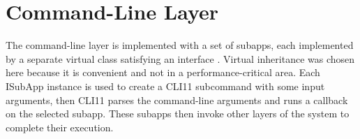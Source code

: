 \section{Command-Line Layer}
The command-line layer is implemented with a set of subapps, each implemented by a separate virtual class satisfying an interface .
Virtual inheritance was chosen here because it is convenient and not in a performance-critical area.
Each ISubApp instance is used to create a CLI11 subcommand with some input arguments, then CLI11 parses the command-line arguments and runs a callback on the selected subapp.
These subapps then invoke other layers of the system to complete their execution.